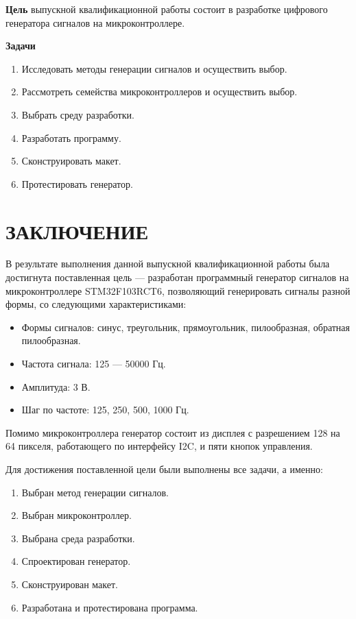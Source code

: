 \documentclass[14pt, oneside]{altsu-bachelor}
\begin{document}
\textbf{Цель}
	выпускной квалификационной работы состоит в разработке цифрового генератора сигналов на микроконтроллере.

\textbf{Задачи}

	\begin{enumerate}
		\item Исследовать методы генерации сигналов и осуществить выбор.
		\item Рассмотреть семейства микроконтроллеров и осуществить выбор.
		\item Выбрать среду разработки.
		\item Разработать программу.
		\item Сконструировать макет.
		\item Протестировать генератор.
	\end{enumerate}





\chapter*{ЗАКЛЮЧЕНИЕ}
	В результате выполнения данной выпускной квалификационной работы была достигнута поставленная цель --- разработан программный генератор сигналов на микроконтроллере STM32F103RCT6, позволяющий генерировать сигналы разной формы, со следующими характеристиками:

	\begin{itemize}
		\item Формы сигналов: синус, треугольник, прямоугольник, пилообразная, обратная пилообразная.
		\item Частота сигнала: 125 --- 50000 Гц.
		\item Амплитуда: 3 В.
		\item Шаг по частоте: 125, 250, 500, 1000 Гц.
	\end{itemize}

	Помимо микроконтроллера генератор состоит из дисплея с разрешением 128 на 64 пикселя, работающего по интерфейсу I2C, и пяти кнопок управления.

	Для достижения поставленной цели были выполнены все задачи, а именно:
	\begin{enumerate}
		\item Выбран метод генерации сигналов.
		\item Выбран микроконтроллер.
		\item Выбрана среда разработки.
		\item Спроектирован генератор.
		\item Сконструирован макет.
		\item Разработана и протестирована программа.
	\end{enumerate}
\end{document}
